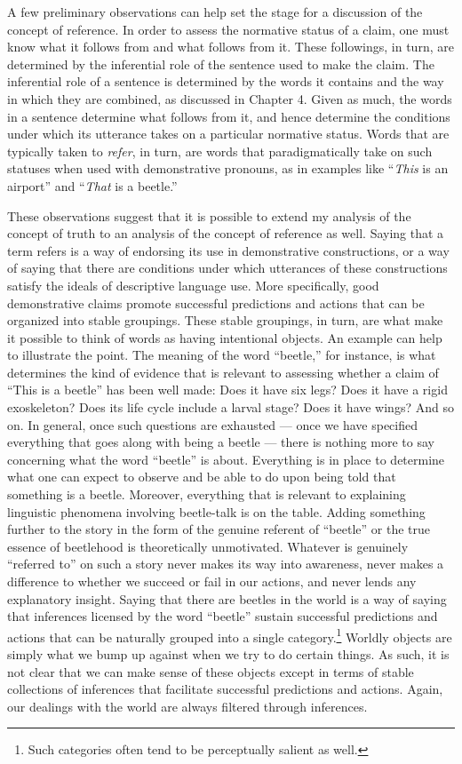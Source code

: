 A few preliminary observations can help set the stage for a discussion of the concept of reference. In order to assess the normative status of a claim, one must know what it follows from and what follows from it. These followings, in turn, are determined by the inferential role of the sentence used to make the claim. The inferential role of a sentence is determined by the words it contains and the way in which they are combined, as discussed in Chapter 4. Given as much, the words in a sentence determine what follows from it, and hence determine the conditions under which its utterance takes on a particular normative status. Words that are typically taken to \textit{refer}, in turn, are words that paradigmatically take on such statuses when used with demonstrative pronouns, as in examples like ``\textit{This} is an airport'' and ``\textit{That} is a beetle.''

These observations suggest that it is possible to extend my analysis of the concept of truth to an analysis of the concept of reference as well. Saying that a term refers is a way of endorsing its use in demonstrative constructions, or a way of saying that there are conditions under which utterances of these constructions satisfy the ideals of descriptive language use. More specifically, good demonstrative claims promote successful predictions and actions that can be organized into stable groupings. These stable groupings, in turn, are what make it possible to think of words as having intentional objects. An example can help to illustrate the point. The meaning of the word ``beetle,'' for instance, is what determines the kind of evidence that is relevant to assessing whether a claim of ``This is a beetle'' has been well made: Does it have six legs? Does it have a rigid exoskeleton? Does its life cycle include a larval stage? Does it have wings? And so on. In general, once such questions are exhausted --- once we have specified everything that goes along with being a beetle --- there is nothing more to say concerning what the word ``beetle'' is about. Everything is in place to determine what one can expect to observe and be able to do upon being told that something is a beetle. Moreover, everything that is relevant to explaining linguistic phenomena involving beetle-talk is on the table. Adding something further to the story in the form of the genuine referent of ``beetle'' or the true essence of beetlehood is theoretically unmotivated. Whatever is genuinely ``referred to'' on such a story never makes its way into awareness, never makes a difference to whether we succeed or fail in our actions, and never lends any explanatory insight. Saying that there are beetles in the world is a way of saying that inferences licensed by the word ``beetle'' sustain successful predictions and actions that can be naturally grouped into a single category.\footnote{Such categories often tend to be perceptually salient as well.} Worldly objects are simply what we bump up against when we try to do certain things. As such, it is not clear that we can make sense of these objects except in terms of stable collections of inferences that facilitate successful predictions and actions. Again, our dealings with the world are always filtered through inferences. 

